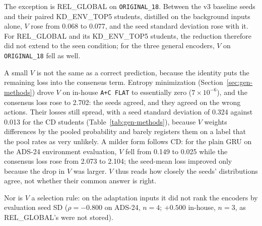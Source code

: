 The exception is REL\_GLOBAL on \texttt{ORIGINAL\_18}. Between the v3
baseline seeds and their paired KD\_ENV\_TOP5 students, distilled on the
background inputs alone, $V$ rose from 0.068 to 0.077, and the seed
standard deviation rose with it.
For REL\_GLOBAL and its
KD\_ENV\_TOP5 students, the reduction therefore did not extend to the
seen condition; for the three general encoders, $V$ on
\texttt{ORIGINAL\_18} fell as well.

A small $V$ is not the same as a correct prediction, because the
identity puts the remaining loss into the consensus term. Entropy
minimization (Section~\ref{sec:gen-methods})
drove $V$ on in-house \texttt{A+C FLAT} to essentially zero
($7\times10^{-6}$), and the consensus loss rose to 2.702: the seeds
agreed, and they agreed on the wrong actions. Their losses still
spread, with a seed standard deviation of 0.324 against 0.013 for the
CD students (Table~\ref{tab:gen-methods}), because $V$ weights
differences by the pooled probability and barely registers them on a
label that the pool rates as very unlikely. A milder form follows CD:
for the plain GRU on the ADS-24 environment
evaluation, $V$ fell from 0.149 to 0.025 while the consensus loss rose
from 2.073 to 2.104; the seed-mean loss improved only because the drop
in $V$ was larger. $V$ thus reads how closely the seeds' distributions
agree, not whether their common answer is right.

Nor is $V$ a selection rule: on the adaptation inputs it did not rank
the encoders by evaluation seed SD ($\rho=-0.800$ on ADS-24, $n=4$;
$+0.500$ in-house, $n=3$, as REL\_GLOBAL's were not stored).
